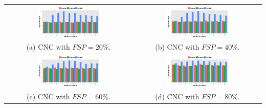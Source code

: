 \documentclass{acm_proc_article-sp}
\begin{document}
\begin{table}[!tb]
\centering
\begin{tabular}{cc}
   \includegraphics[width=0.5\textwidth]{figuresPng/fsTwentyPerc.png} &  \includegraphics[width=0.5\textwidth]{figuresPng/fsFourtyPerc.png}\\
   (a) CNC with $FSP = 20\%$. & (b) CNC with $FSP = 40\%$.\\
   \includegraphics[width=0.5\textwidth]{figuresPng/fsSixtyPerc.png} &  \includegraphics[width=0.5\textwidth]{figuresPng/fsEightyPerc.png}\\
     (c) CNC with $FSP = 60\%$. & (d) CNC with $FSP = 80\%$.\\
\end{tabular}
\label{fig:clusteredResults}
\end{table}
\end{document}
